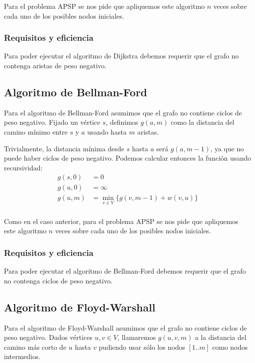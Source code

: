 \documentclass[a4paper, 11pt]{article} %
\begin{document}
    Para el problema APSP se nos pide que apliquemos este algoritmo $n$ veces sobre cada uno
    de los posibles nodos iniciales.
  
    \subsubsection{Requisitos y eficiencia}
      Para poder ejecutar el algoritmo de Dijkstra debemos requerir que el grafo
      no contenga aristas de peso negativo.

  \subsection{Algoritmo de Bellman-Ford}
    Para el algoritmo de Bellman-Ford asumimos que el grafo no contiene ciclos de peso negativo.
    Fijado un vértice $s$, definimos $g(a,m)$ como la distancia del camino mínimo entre $s$ y $a$
    usando hasta $m$ aristas.
    
    Trivialmente, la distancia mínima desde $s$ hasta $a$ será $g(a,m-1)$, ya que no puede
    haber ciclos de peso negativo. Podemos calcular entonces la función usando recursividad:
    \begin{equation} 
      \begin{split}
	g(s,0)  &=  0 \\
	g(u,0)  &=  \infty \\
	g(u,m)  &=  \min_{v \in V} \{g(v,m-1) + w(v,u)\} \\
      \end{split} 
    \end{equation}

    Como en el caso anterior, para el problema APSP se nos pide que apliquemos este algoritmo $n$ veces sobre cada uno
    de los posibles nodos iniciales.
  
    \subsubsection{Requisitos y eficiencia}
      Para poder ejecutar el algoritmo de Bellman-Ford debemos requerir que el grafo
      no contenga ciclos de peso negativo.
      
      
      
  \subsection{Algoritmo de Floyd-Warshall}
    Para el algoritmo de Floyd-Warshall asumimos que el grafo no contiene ciclos de peso negativo.
    Dados vértices $u,v \in V$, llamaremos $g(u,v,m)$ a la distancia del camino más corto de $u$
    hasta $v$ pudiendo usar sólo los nodos $[1..m]$ como nodos intermedios.
    
\end{document}
